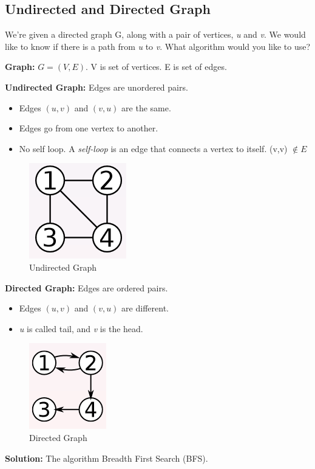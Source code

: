 \documentclass[11pt,fleqn]{book}
\begin{document}
\subsection{Undirected and Directed Graph}
\vspace{1em}
\begin{example}
We're given a directed graph G, along with a pair of vertices, \textit{u} and \textit{v}. We would like to know if there is a path from \textit{u} to \textit{v}. 
What algorithm would you like to use?
\end{example}
\begin{definition}
\textbf{Graph:} $G = (V,E)$. V is set of vertices. E is set of edges. 
\end{definition}
\begin{definition}
\textbf{Undirected Graph:} Edges are unordered pairs. 
\begin{itemize}
    \item Edges $(u,v)$ and $(v,u)$ are the same. 
    \item Edges go from one vertex to another. 
    \item No self loop. A \textit{self-loop} is an edge that connects a vertex to itself. (v,v) $\not \in E$ 
\end{itemize}
\end{definition}
\begin{figure}[h!]
    \centering
    \includegraphics{UG.PNG}
    \caption{Undirected Graph}
    \label{fig:my_label}
\end{figure}
\begin{definition}
\textbf{Directed Graph: } Edges are ordered pairs. 
\begin{itemize}
    \item Edges $(u,v)$ and $(v,u)$ are different. 
    \item \textit{u} is called tail, and \textit{v} is the head. 
\end{itemize}
\end{definition}
\begin{figure}[h!]
    \centering
    \includegraphics{Pictures/dg.PNG}
    \caption{Directed Graph}
    \label{fig:my_label}
\end{figure}
\textbf{Solution:} The algorithm Breadth First Search (BFS). 
 
\end{document}
